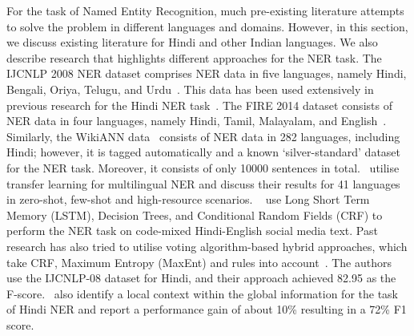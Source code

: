 \documentclass[10pt, a4paper]{article}
\begin{document}
For the task of Named Entity Recognition, much pre-existing literature attempts to solve the problem in different languages and domains. However, in this section, we discuss existing literature for Hindi and other Indian languages. We also describe research that highlights different approaches for the NER task. The IJCNLP 2008 NER dataset comprises NER data in five languages, namely Hindi, Bengali, Oriya, Telugu, and Urdu~\cite{ijcnlp-2008-ijcnlp-08}. This data has been used extensively in previous research for the Hindi NER task~\cite{ekbal2008language,gupta2010think,bhagavatula2012language,gali2008aggregating,saha-etal-2008-hybrid,saha-etal-2008-word}. The FIRE 2014 dataset \cite{FIRE2014} consists of NER data in four languages, namely Hindi, Tamil, Malayalam, and English~\cite{choudhury2014overview}. Similarly, the WikiANN data~\cite{pan2017cross} consists of NER data in 282 languages, including Hindi; however, it is tagged automatically and a known `silver-standard' dataset for the NER task. Moreover, it consists of only 10000 sentences in total.~ utilise transfer learning for multilingual NER and discuss their results for 41 languages in zero-shot, few-shot and high-resource scenarios. ~ use Long Short Term Memory (LSTM), Decision Trees, and Conditional Random Fields (CRF) to perform the NER task on code-mixed Hindi-English social media text. Past research has also tried to utilise voting algorithm-based hybrid approaches, which take CRF, Maximum Entropy (MaxEnt) and rules into  account~\cite{srivastava2011named}. The authors use the IJCNLP-08 dataset for Hindi, and their approach achieved 82.95 as the F-score.~ also identify a local context within the global information for the task of Hindi NER and report a performance gain of about 10\% resulting in a 72\% F1 score. 
\end{document}
